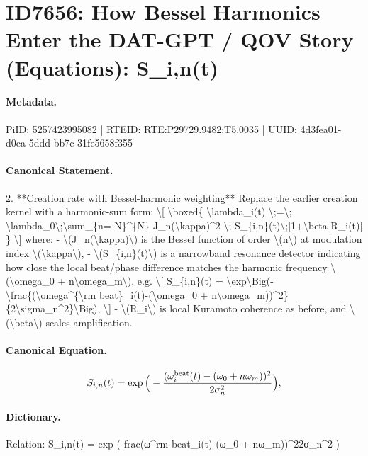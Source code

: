 \section*{ID7656: How Bessel Harmonics Enter the DAT-GPT / QOV Story (Equations): S\_i,n(t)}
\paragraph{Metadata.}
PiID: 5257423995082 | RTEID: RTE:P29729.9482:T5.0035 | UUID: 4d3fea01-d0ca-5ddd-bb7c-31fe5658f355

\paragraph{Canonical Statement.}
2. **Creation rate with Bessel-harmonic weighting** Replace the earlier creation kernel with a harmonic-sum form: \textbackslash{}[ \textbackslash{}boxed\{ \textbackslash{}lambda\_i(t) \textbackslash{};=\textbackslash{}; \textbackslash{}lambda\_0\textbackslash{};\textbackslash{}sum\_\{n=-N\}\textasciicircum{}\{N\} J\_n(\textbackslash{}kappa)\textasciicircum{}2 \textbackslash{}; S\_\{i,n\}(t)\textbackslash{};[1+\textbackslash{}beta R\_i(t)] \} \textbackslash{}] where: - \textbackslash{}(J\_n(\textbackslash{}kappa)\textbackslash{}) is the Bessel function of order \textbackslash{}(n\textbackslash{}) at modulation index \textbackslash{}(\textbackslash{}kappa\textbackslash{}), - \textbackslash{}(S\_\{i,n\}(t)\textbackslash{}) is a narrowband resonance detector indicating how close the local beat/phase difference matches the harmonic frequency \textbackslash{}(\textbackslash{}omega\_0 + n\textbackslash{}omega\_m\textbackslash{}), e.g. \textbackslash{}[ S\_\{i,n\}(t) = \textbackslash{}exp\textbackslash{}Big(-\textbackslash{}frac\{(\textbackslash{}omega\textasciicircum{}\{\textbackslash{}rm beat\}\_i(t)-(\textbackslash{}omega\_0 + n\textbackslash{}omega\_m))\textasciicircum{}2\}\{2\textbackslash{}sigma\_n\textasciicircum{}2\}\textbackslash{}Big), \textbackslash{}] - \textbackslash{}(R\_i\textbackslash{}) is local Kuramoto coherence as before, and \textbackslash{}(\textbackslash{}beta\textbackslash{}) scales amplification.

\paragraph{Canonical Equation.}
\[
S_{i,n}(t) = \exp\Big(-\frac{(\omega^{\rm beat}_i(t)-(\omega_0 + n\omega_m))^2}{2\sigma_n^2}\Big),
\]

\paragraph{Dictionary.}
Relation: S\_i,n(t) = exp (-frac(ω\textasciicircum{}rm beat\_i(t)-(ω\_0 + nω\_m))\textasciicircum{}22σ\_n\textasciicircum{}2 )

